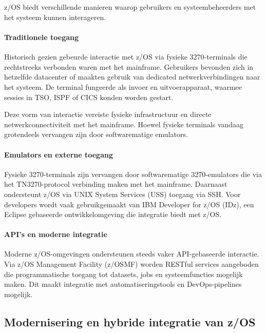 \section{}
\label{sec:interactie-met-zos}
z/OS biedt verschillende manieren waarop gebruikers en systeembeheerders met het systeem kunnen interageren.

\paragraph{Traditionele toegang}
Historisch gezien gebeurde interactie met z/OS via fysieke 3270-terminals 
die rechtstreeks verbonden waren met het mainframe. Gebruikers bevonden zich 
in hetzelfde datacenter of maakten gebruik van dedicated netwerkverbindingen 
naar het systeem. De terminal fungeerde als invoer en uitvoerapparaat, 
waarmee sessies in TSO, ISPF of CICS konden worden gestart.

Deze vorm van interactie vereiste fysieke infrastructuur en directe 
netwerkconnectiviteit met het mainframe. Hoewel fysieke terminals vandaag 
grotendeels vervangen zijn door softwarematige emulators.

\paragraph{Emulators en externe toegang}
Fysieke 3270-terminals zijn vervangen door softwarematige 3270-emulators die via het TN3270-protocol 
verbinding maken met het mainframe. Daarnaast ondersteunt z/OS via UNIX System Services (USS) 
toegang via SSH. Voor developers wordt vaak gebruikgemaakt van IBM Developer for z/OS (IDz), 
een Eclipse gebaseerde ontwikkelomgeving die integratie biedt met z/OS. 

\paragraph{API’s en moderne integratie}
Moderne z/OS-omgevingen ondersteunen steeds vaker API-gebaseerde interactie. 
Via z/OS Management Facility (z/OSMF) worden RESTful services aangeboden 
die programmatische toegang tot datasets, jobs en systeemfuncties mogelijk maken. 
Dit maakt integratie met automatiseringstools en DevOps-pipelines mogelijk.

\subsection{Modernisering en hybride integratie van z/OS}
\label{sec:modernisering-integratie-zos}

